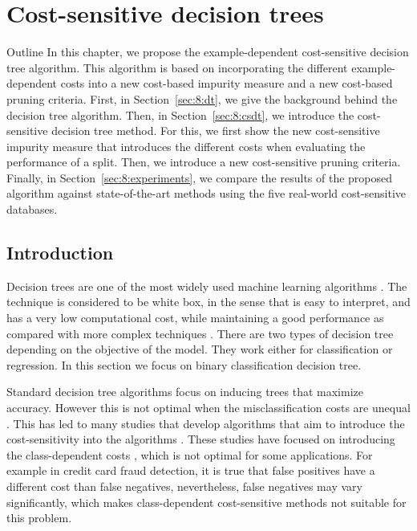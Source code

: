 \chapter{Cost-sensitive decision trees}\label{ch:8}

\begin{remark}{Outline}
In this chapter, we propose the example-dependent cost-sensitive decision tree algorithm. This 
algorithm is 
based on incorporating the different example-dependent costs into a new cost-based impurity measure 
and a new cost-based pruning criteria. First, in Section~\ref{sec:8:dt}, we give the background 
behind the decision tree algorithm. Then, in Section~\ref{sec:8:csdt}, we introduce the 
cost-sensitive decision tree method. For this, we first show the new cost-sensitive impurity 
measure that introduces the different costs when evaluating the performance of a split. Then, we 
introduce a new cost-sensitive pruning criteria. Finally, in Section~\ref{sec:8:experiments}, we 
compare the results of the proposed algorithm against state-of-the-art methods using the five 
real-world cost-sensitive databases.
\end{remark}


\section{Introduction}
\label{sec:8:intro}

Decision trees are one of the most widely used machine learning algorithms \citep{Lior2008}. 
The technique is considered to be white box, in the sense that is easy to interpret, and has a 
very low computational cost, while maintaining a good performance as compared with more complex 
techniques \citep{Hastie2009}. There are two types of decision tree depending on the objective of 
the model. They work either for classification or regression. In this section we focus on
binary classification decision tree.

Standard decision tree algorithms focus on inducing trees that maximize accuracy. However this is 
not optimal when the misclassification costs are unequal \citep{Elkan2001}. This has led to many 
studies that develop algorithms that aim to introduce the cost-sensitivity into the algorithms 
\citep{Lomax2013}. These studies have focused on introducing the class-dependent costs  
\citep{Draper1994,Ting2002,Ling2004,Li2005,Kretowski2006,Vadera2010}, which is not optimal for 
some applications. For example in credit card fraud detection, it is true that false positives 
have a different cost than false negatives, nevertheless, false negatives may vary significantly, 
which makes class-dependent cost-sensitive methods not suitable for this problem.

